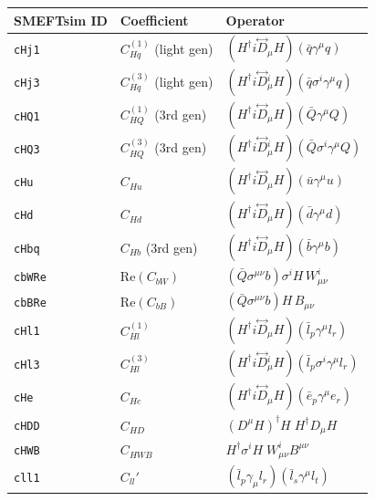 \documentclass[border=8pt]{standalone}
\begin{document}
\renewcommand{\arraystretch}{1.8}
\begin{tabular}{@{} l l l @{}}
\toprule
\textbf{SMEFTsim ID} & \textbf{Coefficient} & \textbf{Operator} \\
\midrule
\texttt{cHj1}  & $C_{Hq}^{(1)}$ \small{(light gen)} & $(H^\dagger i\overset{\leftrightarrow}{D}_\mu H)(\bar{q}\gamma^\mu q)$ \\
\texttt{cHj3}  & $C_{Hq}^{(3)}$ \small{(light gen)} & $(H^\dagger i\overset{\leftrightarrow}{D}{}^i_\mu H)(\bar{q}\sigma^i\gamma^\mu q)$ \\
\texttt{cHQ1}  & $C_{HQ}^{(1)}$ \small{(3rd gen)} & $(H^\dagger i\overset{\leftrightarrow}{D}_\mu H)(\bar{Q}\gamma^\mu Q)$ \\
\texttt{cHQ3}  & $C_{HQ}^{(3)}$ \small{(3rd gen)} & $(H^\dagger i\overset{\leftrightarrow}{D}{}^i_\mu H)(\bar{Q}\sigma^i\gamma^\mu Q)$ \\
\texttt{cHu}   & $C_{Hu}$              & $(H^\dagger i\overset{\leftrightarrow}{D}_\mu H)(\bar{u}\gamma^\mu u)$ \\
\texttt{cHd}   & $C_{Hd}$              & $(H^\dagger i\overset{\leftrightarrow}{D}_\mu H)(\bar{d}\gamma^\mu d)$ \\
\texttt{cHbq}  & $C_{Hb}$ \small{(3rd gen)} & $(H^\dagger i\overset{\leftrightarrow}{D}_\mu H)(\bar{b}\gamma^\mu b)$ \\
\texttt{cbWRe} & $\mathrm{Re}(C_{bW})$ & $(\bar{Q}\sigma^{\mu\nu} b)\sigma^i H\, W^i_{\mu\nu}$ \\
\texttt{cbBRe} & $\mathrm{Re}(C_{bB})$ & $(\bar{Q}\sigma^{\mu\nu} b)H\, B_{\mu\nu}$ \\
\midrule
\texttt{cHl1}  & $C_{Hl}^{(1)}$        & $(H^\dagger i\overset{\leftrightarrow}{D}_\mu H)(\bar{l}_p\gamma^\mu l_r)$ \\
\texttt{cHl3}  & $C_{Hl}^{(3)}$        & $(H^\dagger i\overset{\leftrightarrow}{D}{}^i_\mu H)(\bar{l}_p\sigma^i\gamma^\mu l_r)$ \\
\texttt{cHe}   & $C_{He}$              & $(H^\dagger i\overset{\leftrightarrow}{D}_\mu H)(\bar{e}_p\gamma^\mu e_r)$ \\
\midrule
\texttt{cHDD}  & $C_{HD}$              & $(D^\mu H)^\dagger H \; H^\dagger D_\mu H$ \\
\texttt{cHWB}  & $C_{HWB}$             & $H^\dagger \sigma^i H \; W^i_{\mu\nu} B^{\mu\nu}$ \\
\texttt{cll1}  & $C_{ll}'$             & $(\bar{l}_p\gamma_\mu l_r)(\bar{l}_s\gamma^\mu l_t)$ \\
\bottomrule
\end{tabular}
\end{document}
